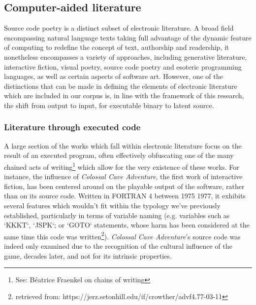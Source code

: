 \documentclass{article}
\begin{document}
\vspace{1\baselineskip}

\subsection{Computer-aided literature}

Source code poetry is a distinct subset of electronic literature. A broad field encompassing natural language texts taking full advantage of the dynamic feature of computing to redefine the concept of text, authorship and readership, it nonetheless encompasses a variety of approaches, including generative literature, interactive fiction, visual poetry, source code poetry and esoteric programming languages, as well as certain aspects of software art. However, one of the distinctions that can be made in defining the elements of electronic literature which are included in our corpus is, in line with the framework of this research, the shift from output to input, for executable binary to latent source.

\subsubsection{Literature through executed code}

A large section of the works which fall within electronic literature focus on the result of an executed program, often effectively obfuscating one of the many chained acts of writing\footnote{See: Béatrice Fraenkel on chains of writing} which allow for the very existence of these works. For instance, the influence of \emph{Colossal Cave Adventure}\cite{crowthers_colossal_1977}, the first work of interactive fiction, has been centered around on the playable output of the software, rather than on its source code. Written in FORTRAN 4 between 1975 1977, it exhibits several features which wouldn't fit within the typology we've previously established, particularly in terms of variable naming (e.g. variables such as `KKKT`, `JSPK`; or `GOTO` statements, whose harm has been considered at the same time this code was written\footnote{retrieved from: https://jerz.setonhill.edu/if/crowther/advf4.77-03-11}). \emph{Colossal Cave Adventure}'s source code was indeed only examined due to the recognition of the cultural influence of the game, decades later, and not for its intrinsic properties.
\end{document}
